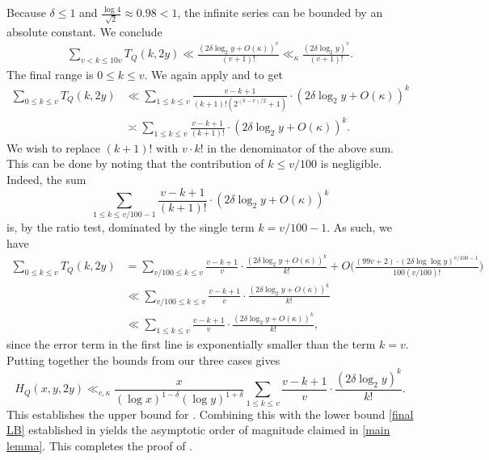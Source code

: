 \documentclass{amsart}
\theoremstyle{definition}
\numberwithin{equation}{section}
\newcommand{\density}{\delta}
\begin{document}
	Because $\density \leq 1$ and $\frac{\log 4}{\sqrt{2}} \approx 0.98 < 1$, the infinite series can be bounded by an absolute constant. We conclude
	\begin{align*}
		\sum_{v < k \leq 10v} T_Q(k,2y) \ll \frac{(2\density \log_2y + O(\kappa))^v}{(v+1)!} \ll_\kappa \frac{(2\density \log_2y)^v}{(v+1)!}.
	\end{align*}
	The final range is $0 \leq k \leq v$. We again apply   and  to get
	\begin{align*}
		\sum_{0 \leq k \leq v} T_Q(k,2y) &\ll \sum_{1 \leq k \leq v} \frac{v-k+1}{(k+1)! (2^{(k-v)/2}+1)}\cdot (2\density \log_2y + O(\kappa))^k\\
		&\asymp \sum_{1 \leq k \leq v} \frac{v-k+1}{(k+1)!}\cdot (2\density \log_2y+O(\kappa))^k.
	\end{align*}
	We wish to replace $(k+1)!$ with $v \cdot k!$ in the denominator of the above sum. This can be done by noting that the contribution of $k \leq v/100$ is negligible. Indeed, the sum
	$$\sum_{1 \leq k \leq v/100 - 1} \frac{v-k+1}{(k+1)!}\cdot (2\density \log_2y +O(\kappa))^k $$
	is, by the ratio test, dominated by the single term $k = v/100 - 1$. As such, we have
	\begin{align*}
		\sum_{0 \leq k \leq v} T_Q(k,2y) &= \sum_{v/100 \leq k \leq v} \frac{v-k+1}{v}\cdot \frac{(2\density \log_2y+O(\kappa))^k}{k!} +O\Big(\frac{(99v + 2)\cdot(2 \delta \log \log y)^{v/100 - 1}}{100 (v/100)!}\Big)\\
		&\ll \sum_{v/100 \leq k \leq v} \frac{v-k+1}{v}\cdot \frac{(2\density \log_2y+O(\kappa))^k}{k!}\\
		&\ll \sum_{1 \leq k \leq v} \frac{v-k+1}{v}\cdot \frac{(2\density \log_2y+O(\kappa))^k}{k!},
	\end{align*}
	since the error term in the first line is exponentially smaller than the term $k = v$. Putting together the bounds from our three cases gives
	$$H_Q(x,y,2y) \ll_{c,\kappa} \frac{x}{(\log x)^{1-\density}(\log y)^{1+\density}}\sum_{1 \leq k \leq v} \frac{v-k+1}{v}\cdot\frac{(2\density \log_2y)^k}{k!}.$$
	This establishes the upper bound for . Combining this with the lower bound \eqref{final LB} established in  yields the asymptotic order of magnitude claimed in \eqref{main lemma}. This completes the proof of .
\end{document}
